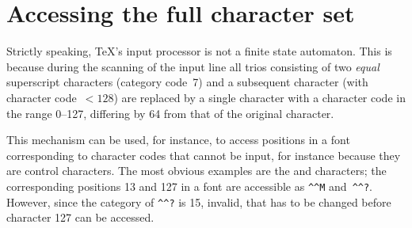 \documentclass{book}
\begin{document}
\section{Accessing the full character set}
\label{hathat}

Strictly speaking, \TeX's input processor
is not a finite state automaton.
This is because during the scanning of the input line
all trios consisting of two {\sl equal\/} superscript characters 
(category code~7) and a subsequent character
(with character code~$<128$)
are replaced by a single character with a character
code in the range 0--127,
differing by 64 from that of the original character.

This mechanism can be used, for instance, to access positions in a font
corresponding to character codes that cannot
be input, for instance because they are \ascii{} control characters.
The most obvious examples are the \ascii{} 
and  characters; the corresponding 
positions 13 and 127 in a font are
accessible as \verb>^^M> and~\verb>^^?>.
However, since the category of \verb>^^?> is 15, invalid,
that has to be changed before character 127 can be accessed.
\end{document}
